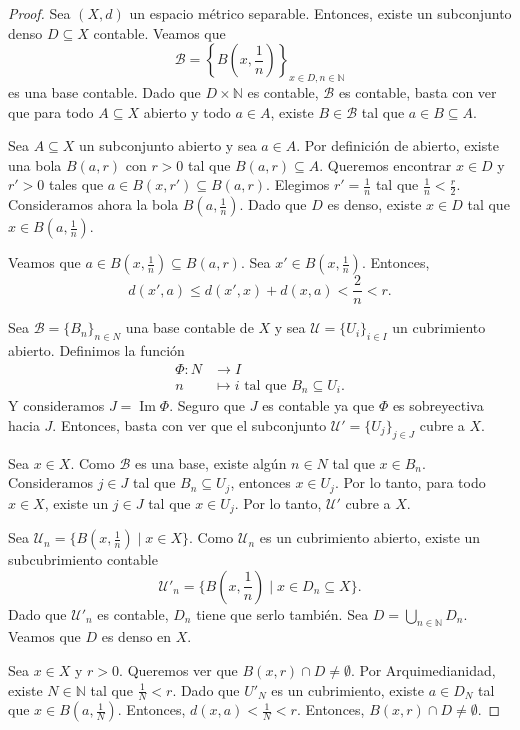 \begin{proof}
	 Sea $(X, d)$ un espacio métrico separable. Entonces, existe un subconjunto denso $D \subseteq X$ contable. Veamos que
	$$
		\mathcal{B} = \left\{ B\left(x, \frac{1}{n}\right) \right\}_{x \in D, n \in \mathbb{N}}
	$$
	es una base contable. Dado que $D \times \mathbb{N}$ es contable, $\mathcal{B}$ es contable, basta con ver que para todo $A \subseteq X$ abierto y todo $a \in A$, existe $B \in \mathcal{B}$ tal que $a \in B \subseteq A$.

	Sea $A \subseteq X$ un subconjunto abierto y sea $a \in A$. Por definición de abierto, existe una bola $B(a, r)$ con $r > 0$ tal que $B(a, r) \subseteq A$. Queremos encontrar $x \in D$ y $r' > 0$ tales que $a \in B(x, r') \subseteq B(a, r)$. Elegimos $r' = \frac{1}{n}$ tal que $\frac{1}{n} < \frac{r}{2}$. Consideramos ahora la bola $B(a, \frac{1}{n})$. Dado que $D$ es denso, existe $x \in D$ tal que $x \in B(a, \frac{1}{n})$.

	Veamos que $a \in B(x, \frac{1}{n}) \subseteq B(a, r)$. Sea $x' \in B(x, \frac{1}{n})$. Entonces,
	$$
		d(x', a) \leq d(x', x) + d(x, a) < \frac{2}{n} < r.
	$$
	\begin{center}
		
	\end{center}

	 Sea $\mathcal{B} = \{ B_n \}_{n \in N}$ una base contable de $X$ y sea $\mathcal{U} = \{ U_i \}_{i \in I}$ un cubrimiento abierto. Definimos la función
	\begin{align*}
		\Phi: N & \to I                                         \\
		n       & \mapsto i \text{ tal que } B_n \subseteq U_i.
	\end{align*}
	Y consideramos $J = \operatorname{Im} \Phi$. Seguro que $J$ es contable ya que $\Phi$ es sobreyectiva hacia $J$. Entonces, basta con ver que el subconjunto $\mathcal{U}' = \{ U_j \}_{j \in J}$ cubre a $X$.

	Sea $x \in X$. Como $\mathcal{B}$ es una base, existe algún $n \in N$ tal que $x \in B_n$. Consideramos $j \in J$ tal que $B_n \subseteq U_j$, entonces $x \in U_j$. Por lo tanto, para todo $x \in X$, existe un $j \in J$ tal que $x \in U_j$. Por lo tanto, $\mathcal{U}'$ cubre a $X$.

	 Sea $\mathcal{U}_n = \{ B(x, \frac{1}{n}) \mid x \in X\}$. Como $\mathcal{U}_n$ es un cubrimiento abierto, existe un subcubrimiento contable
	$$
		\mathcal{U}'_n = \{ B\left(x, \frac{1}{n}\right) \mid x \in D_n \subseteq X\}.
	$$
	Dado que $\mathcal{U}'_n$ es contable, $D_n$ tiene que serlo también. Sea $D = \bigcup_{n \in \mathbb{N}} D_n$. Veamos que $D$ es denso en $X$.

	Sea $x \in X$ y $r > 0$. Queremos ver que $B(x, r) \cap D \neq \emptyset$. Por Arquimedianidad, existe $N \in \mathbb{N}$ tal que $\frac{1}{N} < r$. Dado que $U'_N$ es un cubrimiento, existe $a \in D_N$ tal que $x \in B(a, \frac{1}{N})$. Entonces, $d(x, a) < \frac{1}{N} < r$. Entonces, $B(x, r) \cap D \neq \emptyset$.
\end{proof}

